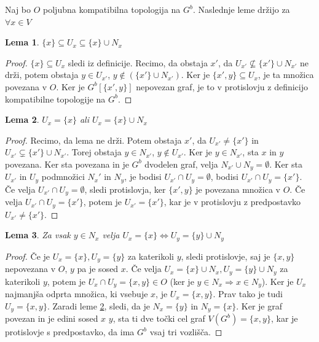 \documentclass[a4paper, 12pt]{book}
\newtheorem{lemma}{Lema}[section]
\theoremstyle{definition}
\begin{document}
Naj bo $O$ poljubna kompatibilna topologija na $G^b$. Naslednje leme držijo za $\forall x \in V$
\begin{lemma}\label{lem1}
  $\{x\} \subseteq U_x \subseteq \{x\} \cup N_x$
\end{lemma}
\begin{proof}
  $\{x\} \subseteq U_x$ sledi iz definicije. Recimo, da obstaja $x'$, da
  $U_{x'} \nsubseteq \{x'\} \cup N_{x'}$ ne drži, potem obstaja
  $y \in U_{x'}$, $y \notin (\{x'\} \cup N_{x'})$. Ker je $\{x', y\} \subseteq U_x$,
  je ta množica povezana v $O$. Ker je $G^b[\{x',y\}]$ nepovezan graf, je to v
  protislovju z definicijo kompatibilne topologije na $G^b$.
\end{proof}
\begin{lemma}\label{lem2}
  $U_x = \{x\}$ ali $U_x = \{x\} \cup N_x$
\end{lemma}
\begin{proof}
  Recimo, da lema ne drži. Potem obstaja $x'$, da $U_{x'} \neq \{x'\}$ in
  $U_{x'} \subsetneq \{x'\} \cup N_{x'}$. Torej obstaja $y \in N_{x'}$, $y \notin U_{x'}$.
  Ker je $y \in N_{x'}$, sta $x$ in $y$ povezana. Ker sta povezana in je $G^b$
  dvodelen graf, velja $N_{x'} \cup N_y = \emptyset$. Ker sta $U_{x'}$ in $U_y$ 
  podmnožici $N_x'$ in $N_y$, je bodisi $U_{x'} \cap U_y = \emptyset$,
  bodisi $U_{x'} \cap U_y = \{x'\}$. Če velja $U_{x'} \cap U_y = \emptyset$, sledi
  protislovja, ker $\{x',y\}$ je povezana množica v $O$.
  Če velja $U_{x'} \cap U_y = \{x'\}$, potem je $U_{x'} = \{x'\}$, kar je v
  protislovju z predpostavko $U_{x'} \neq \{x'\}$.
\end{proof}
\begin{lemma}\label{lem3}
  Za vsak $y \in N_x$ velja $U_x = \{x\} \iff U_y = \{y\} \cup N_y$
\end{lemma}
\begin{proof}
Če je $U_x = \{x\}, U_y = \{y\}$ za katerikoli $y$, sledi protislovje, saj je 
$\{x,y\}$ nepovezana v $O$, $y$ pa je sosed $x$.
Če velja $U_x = \{x\} \cup N_x, U_y = \{y\} \cup N_y$ za katerikoli $y$, potem je
$U_x \cap U_y = \{x, y\} \in O$ (ker je $y \in N_x \Rightarrow x \in N_y$). Ker je
$U_x$ najmanjša odprta množica, ki vsebuje $x$, je $U_x = \{x,y\}$. Prav tako je
tudi $U_y = \{x,y\}$. Zaradi leme \ref*{lem2}, sledi, da je $N_x = \{y\}$ in $N_y = \{x\}$.
Ker je graf povezan in je edini sosed $x$ $y$, sta ti dve točki cel graf
$V(G^b) = \{x,y\}$, kar je protislovje s predpostavko, da ima $G^b$ vsaj tri vozlišča.
\end{proof}
\end{document}
